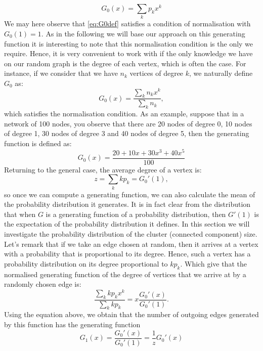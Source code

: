 \begin{equation}\label{eq:G0def}
	G_0(x) = \sum_k p_k x^k
\end{equation}
We may here observe that \eqref{eq:G0def} satisfies a condition of normalisation with $G_0(1) = 1$.
As in the following we will base our approach on this generating function it is interesting to note that this normalisation condition is the only we require.
Hence, it is very convenient to work with if the only knowledge we have on our random graph is the degree of each vertex, which is often the case.
For instance, if we consider that we have $n_k$ vertices of degree $k$, we naturally define $G_0$ as:
\begin{equation}
	G_0(x) = \frac{\sum_k n_k x^k}{\sum_k n_k},
\end{equation}
which satisfies the normalisation condition. 
As an example, suppose that in a network of 100 nodes, you observe that there are 20 nodes of degree 0, 10 nodes of degree 1, 30 nodes of degree 3 and 40 nodes of degree 5, then the generating function is defined as:
\begin{equation}
	G_0(x) = \frac{ 20 + 10x + 30 x^3 + 40x^5}{100}
\end{equation}
Returning to the general case, the average degree of a vertex is:
\begin{equation}
	z = \sum_k kp_k = G_0'(1),
\end{equation}
so once we can compute a generating function, we can also calculate the mean of the probability distribution it generates.
It is in fact clear from the distribution that when $G$ is a generating function of a probability distribution, then $G'(1)$ is the expectation of the probability distribution it defines.
In this section we will investigate the probability distribution of the cluster (connected component) size.
\newline
Let's remark that if we take an edge chosen at random, then it arrives at a vertex with a probability that is proportional to its degree.
Hence, such a vertex has a probability distribution on its degree proportional to $kp_k$. 
Which give that the normalised generating function of the degree of vertices that we arrive at by a randomly chosen edge is:
\begin{equation}\label{eq:kpk}
	\frac{\sum_k kp_kx^k}{\sum_k kp_k} = x\frac{G_0'(x)}{G_0'(1)}.
\end{equation}
Using the equation above, we obtain that the number of outgoing edges generated by this function has the generating function
\begin{equation}
	G_1(x) = \frac{G_0'(x)}{G_0'(1)} = \frac{1}{z}G_0'(x)
\end{equation}
